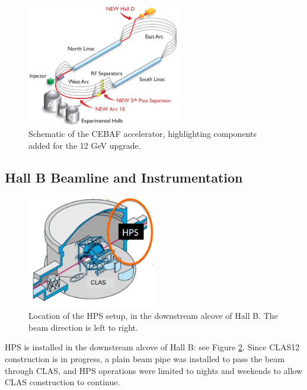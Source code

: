 \begin{figure}[htp]
    \includegraphics[width=0.6\textwidth]{detector/figs/cebaf}
    \caption{Schematic of the CEBAF accelerator, highlighting components added for the 12 GeV upgrade.}
    \label{fig:cebaf}
\end{figure}

\subsection{Hall B Beamline and Instrumentation}

\begin{figure}[htp]
    \begin{center}
        \includegraphics[width=0.5\textwidth]{detector/figs/hallb}
    \end{center}
    \caption{Location of the HPS setup, in the downstream alcove of Hall B.
    The beam direction is left to right.}
    \label{fig:hallb}
\end{figure}

HPS is installed in the downstream alcove of Hall B: see Figure \ref{fig:hallb}.
Since CLAS12 construction is in progress, a plain beam pipe was installed to pass the beam through CLAS, and HPS operations were limited to nights and weekends to allow CLAS construction to continue.

